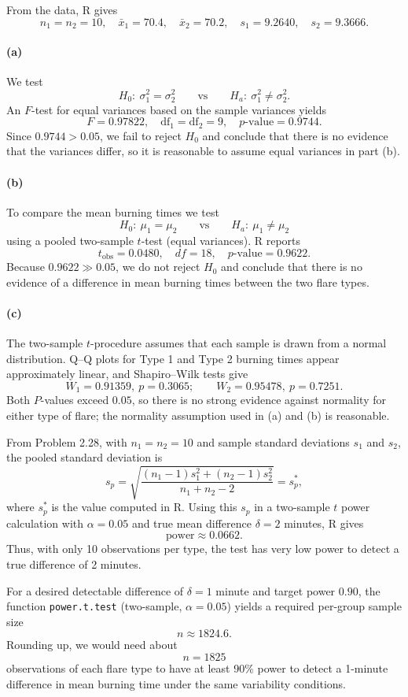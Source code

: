 \documentclass[answers,12pt,addpoints]{exam}
\begin{document}
\begin{questions}
\begin{solution}
  From the data, R gives
\[
n_1 = n_2 = 10,\quad
\bar x_1 = 70.4,\quad
\bar x_2 = 70.2,\quad
s_1 = 9.2640,\quad
s_2 = 9.3666.
\]

\paragraph{(a)}
We test
\[
H_0:\ \sigma_1^2 = \sigma_2^2 \qquad\text{vs}\qquad
H_a:\ \sigma_1^2 \ne \sigma_2^2.
\]
An $F$-test for equal variances based on the sample variances yields
\[
F = 0.97822,\quad \text{df}_1 = \text{df}_2 = 9,\quad p\text{-value} = 0.9744.
\]
Since $0.9744 > 0.05$, we fail to reject $H_0$ and conclude that there is no evidence that the variances differ, so it is reasonable to assume equal variances in part (b).

\paragraph{(b)}
To compare the mean burning times we test
\[
H_0:\ \mu_1 = \mu_2 \qquad\text{vs}\qquad
H_a:\ \mu_1 \ne \mu_2
\]
using a pooled two-sample $t$-test (equal variances). R reports
\[
t_{\text{obs}} = 0.0480,\quad df = 18,\quad p\text{-value} = 0.9622.
\]
Because $0.9622 \gg 0.05$, we do not reject $H_0$ and conclude that there is no evidence of a difference in mean burning times between the two flare types.

\paragraph{(c)}
The two-sample $t$-procedure assumes that each sample is drawn from a normal distribution. Q--Q plots for Type 1 and Type 2 burning times appear approximately linear, and Shapiro--Wilk tests give
\[
W_1 = 0.91359,\ p = 0.3065;\qquad
W_2 = 0.95478,\ p = 0.7251.
\]
Both $P$-values exceed $0.05$, so there is no strong evidence against normality for either type of flare; the normality assumption used in (a) and (b) is reasonable.

From Problem 2.28, with $n_1 = n_2 = 10$ and sample standard deviations $s_1$ and $s_2$, the pooled standard deviation is
\[
s_p = \sqrt{\frac{(n_1-1)s_1^2 + (n_2-1)s_2^2}{n_1 + n_2 - 2}} = s_p^{\ast},
\]
where $s_p^{\ast}$ is the value computed in R. Using this $s_p$ in a two-sample $t$ power calculation with $\alpha = 0.05$ and true mean difference $\delta = 2$ minutes, R gives
\[
\text{power} \approx 0.0662.
\]
Thus, with only 10 observations per type, the test has very low power to detect a true difference of 2 minutes.

For a desired detectable difference of $\delta = 1$ minute and target power $0.90$, the function \texttt{power.t.test} (two-sample, $\alpha = 0.05$) yields a required per-group sample size
\[
n \approx 1824.6.
\]
Rounding up, we would need about
\[
n = 1825
\]
observations of each flare type to have at least 90\% power to detect a 1-minute difference in mean burning time under the same variability conditions.

\end{solution}



\end{questions}
\end{document}
